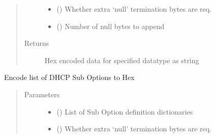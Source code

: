\documentclass[letterpaper,10pt,english]{sphinxmanual}
\begin{document}
\begin{fulllineitems}
\begin{fulllineitems}
\begin{quote}
\begin{description}
\begin{itemize}
\item {} 
\sphinxAtStartPar
{} () \textendash{} Whether extra ‘null’ termination bytes are req.

\item {} 
\sphinxAtStartPar
{} () \textendash{} Number of null bytes to append

\end{itemize}

\item[{Returns}] \leavevmode
\sphinxAtStartPar
Hex encoded data for specified data\sphinxhyphen{}type as string

\end{description}\end{quote}

\end{fulllineitems}


\begin{fulllineitems}
\label{\detokenize{dhcp_encode-class:bloxone.dhcp_encode.encode_dhcp_option}}
\sphinxAtStartPar
Encode list of DHCP Sub Options to Hex
\begin{quote}\begin{description}
\item[{Parameters}] \leavevmode\begin{itemize}
\item {} 
\sphinxAtStartPar
{} () \textendash{} List of Sub Option definition dictionaries

\item {} 
\sphinxAtStartPar
{} () \textendash{} Whether extra ‘null’ termination bytes are req.


\end{itemize}
\end{description}
\end{quote}
\end{fulllineitems}
\end{fulllineitems}
\end{document}
